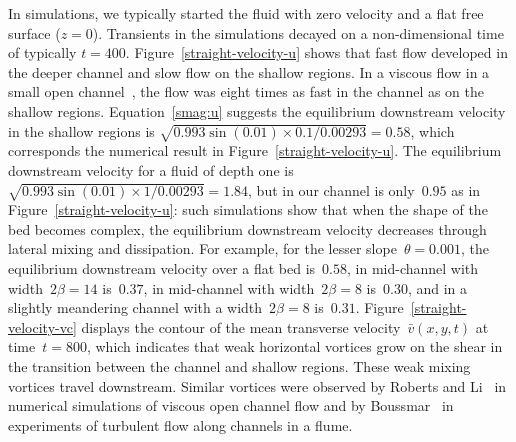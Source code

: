 \documentclass[a5paper,12pt]{article}
\newcommand{\vv}{{\bar v}}
\begin{document}
In simulations, we typically started the fluid with zero velocity and a flat free surface ($z=0$). 
Transients in the simulations decayed on a non-dimensional time of typically $t=400$.
Figure~\ref{straight-velocity-u} shows that fast flow developed in the deeper channel and slow flow on the shallow regions.
In a viscous flow in a small open channel~\cite{Robertsli2006}, the flow was eight times as fast in the channel as on the shallow regions. 
Equation~\eqref{smag:u} suggests the equilibrium downstream velocity in the shallow regions is $\sqrt{0.993\sin(0.01)\times0.1/0.00293}=0.58$, which corresponds the numerical result in Figure~\ref{straight-velocity-u}. 
The equilibrium downstream velocity for a fluid of depth one is $\sqrt{0.993\sin(0.01)\times1/0.00293}=1.84$, but in our channel is only~$0.95$ as in Figure~\ref{straight-velocity-u}: 
such simulations show that when the shape of the bed becomes complex, the equilibrium downstream velocity decreases through lateral mixing and dissipation. 
For example, for the lesser slope~$\theta=0.001$, the equilibrium downstream velocity over a flat bed is~$0.58$, in mid-channel with  width~$2\beta=14$ is~$0.37$, in mid-channel with  width~$2\beta=8$ is~$0.30$, and in a slightly meandering channel with a width~$2\beta=8$ is~$0.31$.
Figure~\ref{straight-velocity-vc} displays the contour of the mean transverse velocity~$\vv(x,y,t)$ at time~$t=800$, which indicates that weak horizontal vortices grow on the shear in the transition between the channel and shallow regions.  
These weak mixing vortices travel downstream. 
Similar vortices were observed by Roberts and Li~\cite{Robertsli2006} in numerical simulations of viscous open channel flow and by Boussmar~\cite{Bousmar2003a} in experiments of turbulent flow along channels in a flume. 
\end{document}
